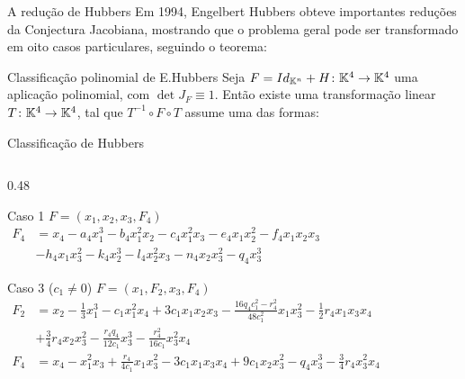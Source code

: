 \begin{frame}{A redução de Hubbers}
    Em 1994, Engelbert Hubbers obteve importantes reduções da Conjectura Jacobiana, mostrando que o problema geral pode ser transformado em oito casos particulares, seguindo o teorema:
\vspace{1cm}
    \begin{teobox}{Classificação polinomial de E.Hubbers}
            Seja $F = Id_{\mathbb{K}^n} + H\colon \mathbb{K}^4\to\mathbb{K}^4$ uma aplicação polinomial, com $\det J_F \equiv 1$. Então existe uma transformação linear $T\colon \mathbb{K}^4\to\mathbb{K}^4$, tal que $T^{-1}\circ F\circ T$ assume uma das formas:
    \end{teobox}
\end{frame}

\begin{frame}{Classificação de Hubbers}
    \footnotesize
    \begin{columns}[t]
        \begin{column}{0.48\textwidth}
            \begin{block}{Caso 1}
                $F = (x_1, x_2, x_3, F_4)$ \\
                \vspace{0.2em}
                $\begin{aligned}
                    F_4 &= x_4 - a_4 x_1^3 - b_4 x_1^2 x_2 - c_4 x_1^2 x_3 - e_4 x_1 x_2^2 - f_4 x_1 x_2 x_3 \\&- h_4 x_1 x_3^2 - k_4 x_2^3 - l_4 x_2^2 x_3 - n_4 x_2 x_3^2 - q_4 x_3^3
                \end{aligned}$
            \end{block}
\vspace{0.9cm}
\begin{block}{Caso 3 ($c_1 \neq 0$)}
                $F = (x_1, F_2, x_3, F_4)$ \\
                \tiny
                $\begin{aligned}
                    F_2 &= x_2 - \tfrac{1}{3} x_1^3 - c_1 x_1^2 x_4 + 3 c_1 x_1 x_2 x_3 
                    - \tfrac{16 q_4 c_1^2 - r_4^2}{48 c_1^2} x_1 x_3^2 - \tfrac{1}{2} r_4 x_1 x_3 x_4 \\
                    &+ \tfrac{3}{4} r_4 x_2 x_3^2 - \tfrac{r_4 q_4}{12 c_1} x_3^3 - \tfrac{r_4^2}{16 c_1} x_3^2 x_4 \\
                    F_4 &= x_4 - x_1^2 x_3 + \tfrac{r_4}{4 c_1} x_1 x_3^2 - 3 c_1 x_1 x_3 x_4 
                    + 9 c_1 x_2 x_3^2 - q_4 x_3^3 - \tfrac{3}{4} r_4 x_3^2 x_4
                \end{aligned}$
            \end{block}


\end{column}
\end{columns}
\end{frame}
